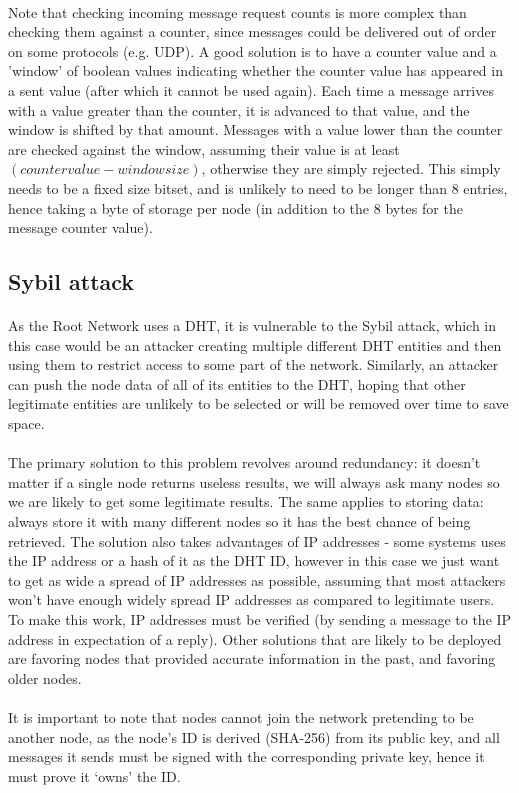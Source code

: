 \documentclass{article}
\begin{document}
\paragraph{}
Note that checking incoming message request counts is more complex than checking them against a counter, since messages could be delivered out of order on some protocols (e.g. UDP). A good solution is to have a counter value and a 'window' of boolean values indicating whether the counter value has appeared in a sent value (after which it cannot be used again). Each time a message arrives with a value greater than the counter, it is advanced to that value, and the window is shifted by that amount. Messages with a value lower than the counter are checked against the window, assuming their value is at least $(counter value - window size)$, otherwise they are simply rejected. This simply needs to be a fixed size bitset, and is unlikely to need to be longer than 8 entries, hence taking a byte of storage per node (in addition to the 8 bytes for the message counter value).

\subsection{Sybil attack}

\paragraph{}
As the Root Network uses a DHT, it is vulnerable to the Sybil attack, which in this case would be an attacker creating multiple different DHT entities and then using them to restrict access to some part of the network. Similarly, an attacker can push the node data of all of its entities to the DHT, hoping that other legitimate entities are unlikely to be selected or will be removed over time to save space.

\paragraph{}
The primary solution to this problem revolves around redundancy: it doesn't matter if a single node returns useless results, we will always ask many nodes so we are likely to get some legitimate results. The same applies to storing data: always store it with many different nodes so it has the best chance of being retrieved. The solution also takes advantages of IP addresses - some systems uses the IP address or a hash of it as the DHT ID, however in this case we just want to get as wide a spread of IP addresses as possible, assuming that most attackers won't have enough widely spread IP addresses as compared to legitimate users. To make this work, IP addresses must be verified (by sending a message to the IP address in expectation of a reply). Other solutions that are likely to be deployed are favoring nodes that provided accurate information in the past, and favoring older nodes.

\paragraph{}
It is important to note that nodes cannot join the network pretending to be another node, as the node's ID is derived (SHA-256) from its public key, and all messages it sends must be signed with the corresponding private key, hence it must prove it `owns' the ID.
\end{document}
